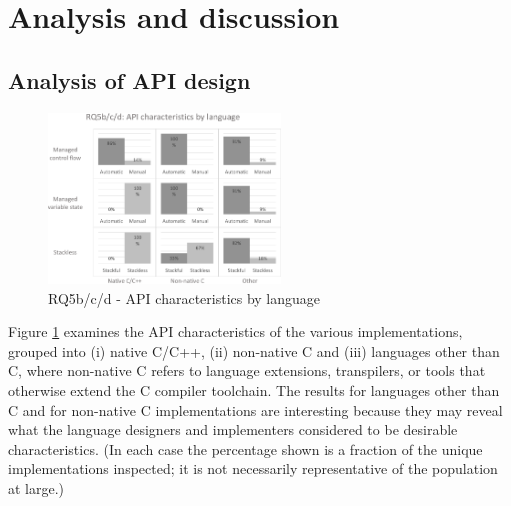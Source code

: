 \documentclass[format=acmsmall, review=false, screen=false]{acmart}
\begin{document}
\section{Analysis and discussion}
\label{section:analysis}

\subsection{Analysis of API design}
\label{analysis-of-api-design}

\begin{figure}[h]
	\includegraphics[width=0.55\textwidth]{RQ5b-c-d-API-characteristics-by-language}
	\caption{RQ5b/c/d - API characteristics by language}
	\label{fig:rq5bcd}
\end{figure}

%		

Figure \ref{fig:rq5bcd} examines the API characteristics of the various implementations, grouped into (i) native C/C++, (ii) non-native C and (iii) languages other than C, where non-native C refers to language extensions, transpilers, or tools that otherwise extend the C compiler toolchain. The results for languages other than C and for non-native C implementations are interesting because they may reveal what the language designers and implementers considered to be desirable characteristics. (In each case the percentage shown is a fraction of the unique implementations inspected; it is not necessarily representative of the population at large.)
\end{document}
